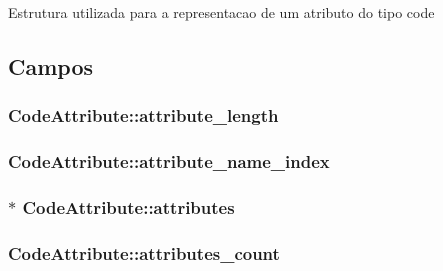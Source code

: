 Estrutura utilizada para a representacao de um atributo do tipo code 

\subsection{Campos}
\hypertarget{struct_code_attribute_a612405902fb38f8f04e8cd55e875a3a5}{}
\subsubsection[{attribute\+\_\+length}]{ Code\+Attribute\+::attribute\+\_\+length}\label{struct_code_attribute_a612405902fb38f8f04e8cd55e875a3a5}
\hypertarget{struct_code_attribute_a87132111c747d163d9b94ec155c1e1db}{}
\subsubsection[{attribute\+\_\+name\+\_\+index}]{ Code\+Attribute\+::attribute\+\_\+name\+\_\+index}\label{struct_code_attribute_a87132111c747d163d9b94ec155c1e1db}
\hypertarget{struct_code_attribute_adafab3efe6d9eefdead891ef70badea8}{}
\subsubsection[{attributes}]{$\ast$ Code\+Attribute\+::attributes}\label{struct_code_attribute_adafab3efe6d9eefdead891ef70badea8}
\hypertarget{struct_code_attribute_a550161b02b161e5ab2c489d33831d175}{}
\subsubsection[{attributes\+\_\+count}]{ Code\+Attribute\+::attributes\+\_\+count}\label{struct_code_attribute_a550161b02b161e5ab2c489d33831d175}
\hypertarget{struct_code_attribute_ace67f68bc8bc1d0ee3f86f173a83d7aa}{}
